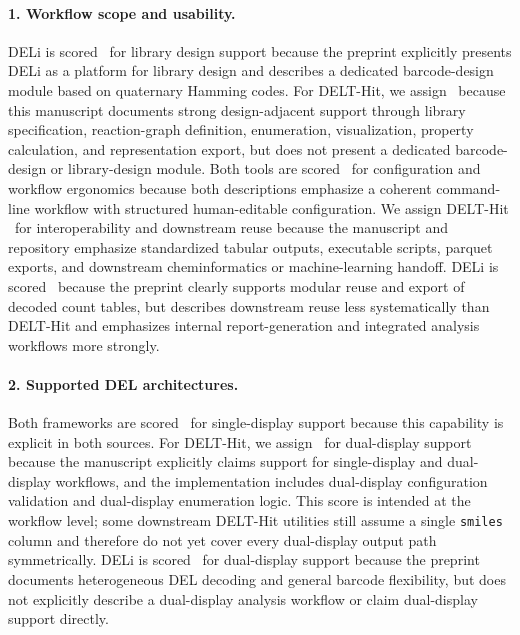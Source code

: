 \paragraph{1. Workflow scope and usability.}
DELi is scored \statusgreen\ for library design support because the preprint explicitly presents DELi as a platform for library design and describes a dedicated barcode-design module based on quaternary Hamming codes. For DELT-Hit, we assign \statusamber\ because this manuscript documents strong design-adjacent support through library specification, reaction-graph definition, enumeration, visualization, property calculation, and representation export, but does not present a dedicated barcode-design or library-design module. Both tools are scored \statusgreen\ for configuration and workflow ergonomics because both descriptions emphasize a coherent command-line workflow with structured human-editable configuration. We assign DELT-Hit \statusgreen\ for interoperability and downstream reuse because the manuscript and repository emphasize standardized tabular outputs, executable scripts, parquet exports, and downstream cheminformatics or machine-learning handoff. DELi is scored \statusamber\ because the preprint clearly supports modular reuse and export of decoded count tables, but describes downstream reuse less systematically than DELT-Hit and emphasizes internal report-generation and integrated analysis workflows more strongly.

\paragraph{2. Supported DEL architectures.}
Both frameworks are scored \statusgreen\ for single-display support because this capability is explicit in both sources. For DELT-Hit, we assign \statusgreen\ for dual-display support because the manuscript explicitly claims support for single-display and dual-display workflows, and the implementation includes dual-display configuration validation and dual-display enumeration logic. This score is intended at the workflow level; some downstream DELT-Hit utilities still assume a single \texttt{smiles} column and therefore do not yet cover every dual-display output path symmetrically. DELi is scored \statusopen\ for dual-display support because the preprint documents heterogeneous DEL decoding and general barcode flexibility, but does not explicitly describe a dual-display analysis workflow or claim dual-display support directly.

